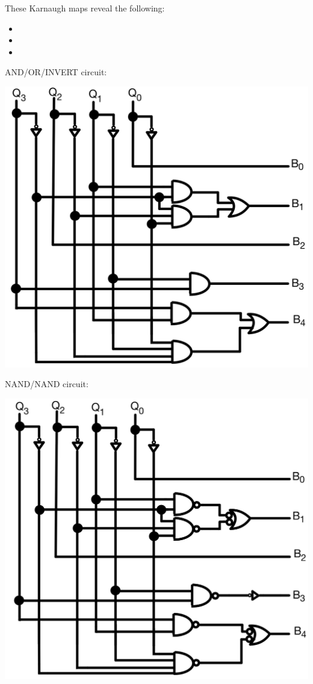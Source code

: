 \documentclass{article}
\begin{document}
\begin{enumerate}
        These Karnaugh maps reveal the following:
        \begin{itemize}
            \item {}
            \item {}
            \item {}
        \end{itemize}

        AND/OR/INVERT circuit:
        \begin{center}
            \includegraphics[scale=0.2]{figs/p4a.jpeg}
        \end{center}

        NAND/NAND circuit:
        \begin{center}
            \includegraphics[scale=0.2]{figs/p4b.jpeg}
        \end{center}

    \end{enumerate}
\end{document}
